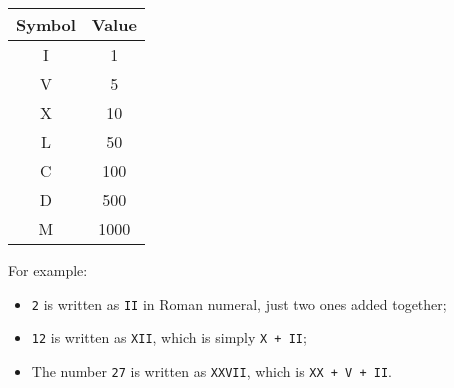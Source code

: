 \begin{table}[H]
\centering
\begin{tabular}{|c|c|}
\hline
Symbol & Value \\ \hline
I      & 1     \\ \hline
V      & 5     \\ \hline
X      & 10    \\ \hline
L       & 50 \\ \hline
C       & 100 \\ \hline
D       & 500 \\ \hline
M       & 1000 \\ \hline
\end{tabular}
\end{table}

For example:
\begin{itemize}
\item {\colorbox{CodeBackground}{\lstinline|2|}} is written as {\colorbox{CodeBackground}{\lstinline|II|}} in Roman numeral, just two ones added together;
\item {\colorbox{CodeBackground}{\lstinline|12|}} is written as {\colorbox{CodeBackground}{\lstinline|XII|}}, which is simply {\colorbox{CodeBackground}{\lstinline|X + II|}};
\item The number {\colorbox{CodeBackground}{\lstinline|27|}} is written as {\colorbox{CodeBackground}{\lstinline|XXVII|}}, which is {\colorbox{CodeBackground}{\lstinline|XX + V + II|}}.
\end{itemize}\mbox{}


